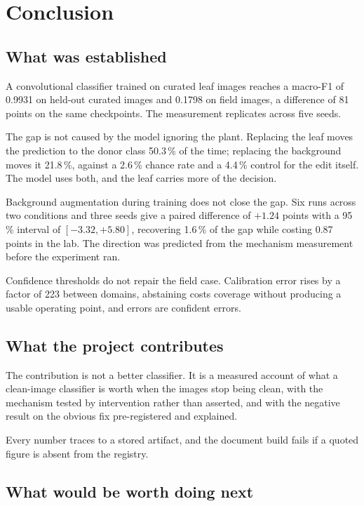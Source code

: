 
\chapter{Conclusion}
\label{ch:conclusion}

\section{What was established}

A convolutional classifier trained on curated leaf images reaches a macro-F1 of
0.9931 on held-out curated images and 0.1798 on field images, a difference of 81
points on the same checkpoints. The measurement replicates across five seeds.

The gap is not caused by the model ignoring the plant. Replacing the leaf moves the
prediction to the donor class 50.3\,\% of the time; replacing the background moves it
21.8\,\%, against a 2.6\,\% chance rate and a 4.4\,\% control for the edit itself.
The model uses both, and the leaf carries more of the decision.

Background augmentation during training does not close the gap. Six runs across two
conditions and three seeds give a paired difference of $+1.24$ points with a 95\,\%
interval of $[-3.32, +5.80]$, recovering 1.6\,\% of the gap while costing 0.87 points
in the lab. The direction was predicted from the mechanism measurement before the
experiment ran.

Confidence thresholds do not repair the field case. Calibration error rises by a
factor of 223 between domains, abstaining costs coverage without producing a usable
operating point, and errors are confident errors.

\section{What the project contributes}

The contribution is not a better classifier. It is a measured account of what a
clean-image classifier is worth when the images stop being clean, with the mechanism
tested by intervention rather than asserted, and with the negative result on the
obvious fix pre-registered and explained.

Every number traces to a stored artifact, and the document build fails if a quoted
figure is absent from the registry.

\section{What would be worth doing next}


